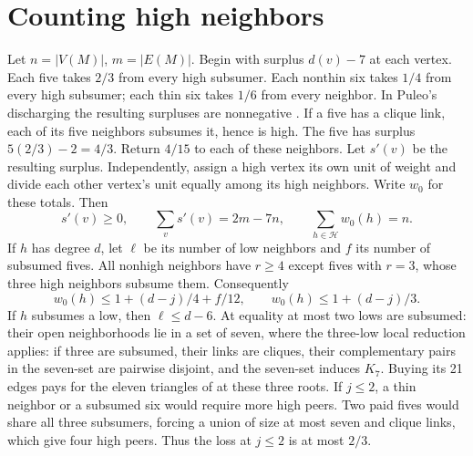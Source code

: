 \documentclass[11pt,a4paper]{amsart}
\newcommand{\Hi}{\mathcal H}
\begin{document}
\section{Counting high neighbors}\label{sec:count}
Let $n=|V(M)|$, $m=|E(M)|$. Begin with surplus $d(v)-7$ at each
vertex. Each five takes $2/3$ from every high subsumer. Each
nonthin six takes $1/4$ from every high subsumer; each thin six
takes $1/6$ from every neighbor. In Puleo's discharging the resulting
surpluses are nonnegative \cite[\S2, Lemmas 2.7--2.8]{puleo}.
If a five has a clique
link, each of its five neighbors subsumes it, hence is high. The five
has surplus $5(2/3)-2=4/3$. Return $4/15$ to each of these neighbors.
Let $s'(v)$ be the resulting surplus. Independently, assign a high
vertex its own unit of weight and divide each other vertex's unit
equally among its high neighbors. Write $w_0$ for these totals.
Then
\begin{equation}\label{eq:sum}
  s'(v)\ge0,\qquad \sum_v s'(v)=2m-7n,\qquad
  \sum_{h\in\Hi}w_0(h)=n .
\end{equation}
If $h$ has degree $d$, let $\ell$ be its number of low neighbors
and $f$ its number of subsumed fives. All nonhigh neighbors have
$r\ge4$ except fives with $r=3$, whose three high neighbors subsume
them. Consequently
\begin{equation}\label{eq:wzero}
 w_0(h)\le1+(d-j)/4+f/12,\qquad w_0(h)\le1+(d-j)/3 .
\end{equation}
If $h$ subsumes a low, then $\ell\le d-6$. At equality at most two
lows are subsumed: their open neighborhoods lie in a set of seven,
where the three-low local reduction applies: if three are subsumed,
their links are cliques, their complementary pairs in the seven-set
are pairwise disjoint, and the seven-set induces $K_7$. Buying its
21 edges pays for the eleven triangles of \cite[Fig.~4]{bfg} at
these three roots. If $j\le2$, a thin
neighbor or a subsumed six would require more high peers. Two paid
fives would share all three subsumers, forcing a union of size at
most seven and clique links, which give four high peers. Thus the
loss at $j\le2$ is at most $2/3$.
\end{document}
